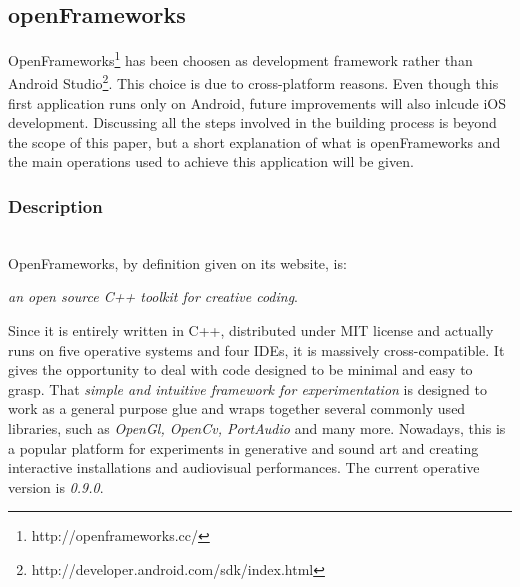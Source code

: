\documentclass[journal]{IEEEtran}
\begin{document}
\subsection{openFrameworks}
OpenFrameworks\footnote{http://openframeworks.cc/\label{refOF}} has been choosen as development framework rather than Android Studio\footnote{http://developer.android.com/sdk/index.html}. This choice is due to cross-platform reasons. Even though this first application runs only on Android, future improvements will also inlcude iOS development.
Discussing all the steps involved in the building process is beyond the scope of this paper, but a short explanation of what is openFrameworks and the main operations used to achieve this application will be given. \\
\subsubsection{Description}~\\
OpenFrameworks, by definition given on its website, is:
\begin{center}
{\footnotesize{\textit{an open source C++ toolkit for creative coding}}.}
\end{center}
Since it is entirely written in C++, distributed under MIT license and actually runs on five operative systems and four IDEs, it is massively cross-compatible. It gives the opportunity to deal with code designed to be minimal and easy to grasp. 
That \textit{simple and intuitive framework for experimentation} is designed to work as a general purpose glue and wraps together several commonly used libraries, such as \emph{OpenGl, OpenCv, PortAudio} and many more. Nowadays, this is a popular platform for experiments in generative and sound art and creating interactive installations and audiovisual performances. The current operative version is \emph{0.9.0}.
\end{document}
